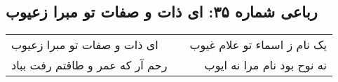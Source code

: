 \begin{center}
\section*{رباعی شماره ۳۵: ای ذات و صفات تو مبرا زعیوب}
\label{sec:sh035}
\begin{longtable}{l p{0.5cm} r}
ای ذات و صفات تو مبرا زعیوب
&&
یک نام ز اسماء تو علام غیوب
\\
رحم آر که عمر و طاقتم رفت بباد
&&
نه نوح بود نام مرا نه ایوب
\\
\end{longtable}
\end{center}
